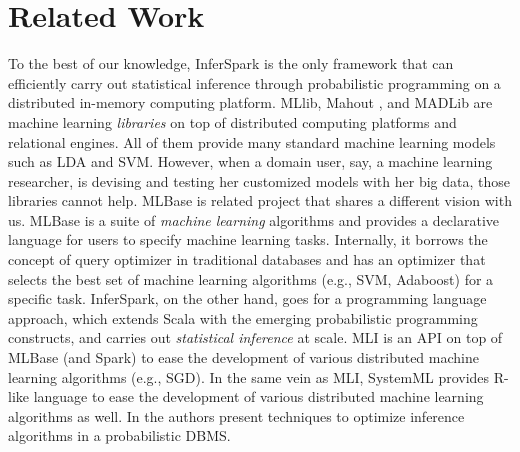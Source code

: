 
\section{Related Work}
\label{sec:related}

To the best of our knowledge, InferSpark is the only framework that can efficiently carry out statistical inference through probabilistic programming on a distributed in-memory computing platform.
MLlib, Mahout \cite{mahout}, and MADLib \cite{madlib} are machine learning \emph{libraries} on top of distributed computing platforms and relational engines.
All of them provide many standard machine learning models such as LDA and SVM.
However, when a domain user, say, a machine learning researcher, 
is devising and testing her customized models with her big data, 
those libraries cannot help.
MLBase \cite{mlbase} is related project that shares a different vision with us.
MLBase is a suite of {\em machine learning} algorithms and provides 
a declarative language for users to specify machine learning tasks.
Internally, it borrows the concept of query optimizer in traditional databases 
and has an optimizer that selects the best set of machine learning 
algorithms (e.g., SVM, Adaboost) for a specific task.
InferSpark, on the other hand, goes for a programming language approach, 
which extends Scala with the emerging probabilistic programming constructs,
and carries out {\em statistical inference} at scale. 
MLI \cite{mli} is an API on top of MLBase (and Spark) to ease the development of various distributed machine learning algorithms (e.g., SGD).
In the same vein as MLI, SystemML \cite{systemml} provides R-like language to ease the development of various distributed machine learning algorithms as well.
In \cite{Wang:2011} the authors present techniques to optimize inference algorithms in a probabilistic DBMS.



